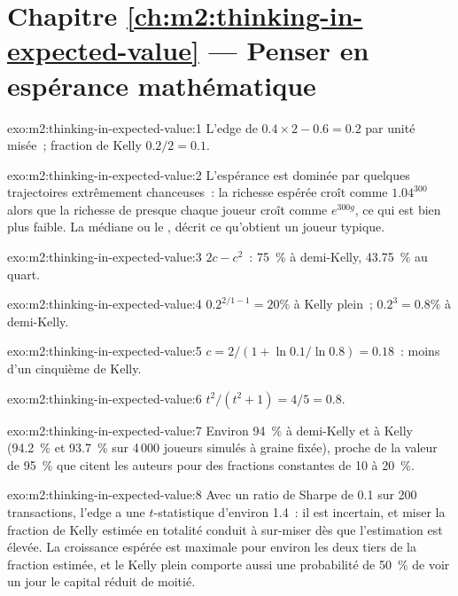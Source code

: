 \section*{Chapitre \ref{ch:m2:thinking-in-expected-value} --- Penser en espérance mathématique}

\begin{solution}{exo:m2:thinking-in-expected-value:1}
L'edge de $0.4 \times 2 - 0.6 = 0.2$ par unité misée~; fraction de Kelly $0.2/2 = 0.1$.
\end{solution}

\begin{solution}{exo:m2:thinking-in-expected-value:2}
L'espérance est dominée par quelques trajectoires extrêmement chanceuses~: la richesse espérée croît comme $1.04^{300}$
alors que la richesse de presque chaque joueur croît comme $e^{300g}$, ce qui est bien plus faible. La médiane
ou le , décrit ce qu'obtient un joueur typique.
\end{solution}

\begin{solution}{exo:m2:thinking-in-expected-value:3}
$2c - c^2$~: 75~\% à demi-Kelly, 43.75~\% au quart.
\end{solution}

\begin{solution}{exo:m2:thinking-in-expected-value:4}
$0.2^{2/1 - 1} = 20\%$ à Kelly plein~; $0.2^{3} = 0.8\%$ à demi-Kelly.
\end{solution}

\begin{solution}{exo:m2:thinking-in-expected-value:5}
$c = 2/(1 + \ln 0.1/\ln 0.8) = 0.18$~: moins d'un cinquième de Kelly.
\end{solution}

\begin{solution}{exo:m2:thinking-in-expected-value:6}
$t^2/(t^2 + 1) = 4/5 = 0.8$.
\end{solution}

\begin{solution}{exo:m2:thinking-in-expected-value:7}
Environ 94~\% à demi-Kelly et à Kelly (94.2~\% et 93.7~\% sur 4\,000 joueurs simulés à graine fixée), proche de
la valeur de 95~\% que citent les auteurs pour des fractions constantes de 10 à 20~\%.
\end{solution}

\begin{solution}{exo:m2:thinking-in-expected-value:8}
Avec un ratio de Sharpe de 0.1 sur 200 transactions, l'edge a une $t$-statistique d'environ 1.4~: il est
incertain, et miser la fraction de Kelly estimée en totalité conduit à sur-miser dès que l'estimation est
élevée. La croissance espérée est maximale pour environ les deux tiers de la fraction estimée,
et le Kelly plein comporte aussi une probabilité de 50~\% de voir un jour le capital réduit de moitié.
\end{solution}

